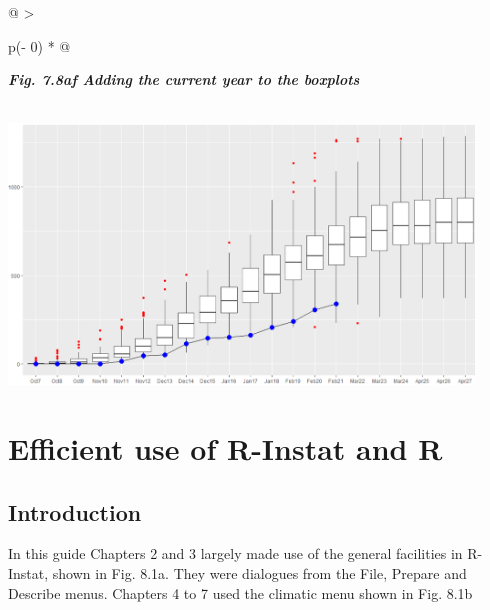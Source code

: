 \documentclass[
  letterpaper,
  DIV=11,
  numbers=noendperiod]{scrreprt}
\begin{document}
\begin{longtable}[]{@{}
  >{\raggedright\arraybackslash}p{(\columnwidth - 0\tabcolsep) * }@{}}
\toprule\noalign{}
\begin{minipage}[b]{\linewidth}\raggedright
\textbf{\emph{Fig. 7.8af Adding the current year to the boxplots}}
\end{minipage} \\
\midrule\noalign{}
\endhead
\bottomrule\noalign{}
\endlastfoot
\includegraphics[width=4.86214in,height=2.72681in]{figures/Fig7.8af.png} \\
\end{longtable}


\chapter{Efficient use of R-Instat and
R}\label{efficient-use-of-r-instat-and-r}

\section{Introduction}\label{introduction-6}

In this guide Chapters 2 and 3 largely made use of the general
facilities in R-Instat, shown in Fig. 8.1a. They were dialogues from the
File, Prepare and Describe menus. Chapters 4 to 7 used the climatic menu
shown in Fig. 8.1b
\end{document}
